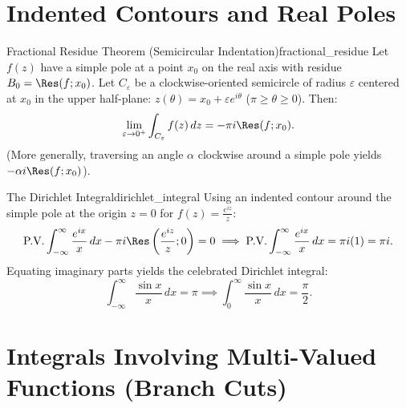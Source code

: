 \section{Indented Contours and Real Poles}

\begin{theorem}{Fractional Residue Theorem (Semicircular Indentation)}{fractional_residue}
Let $f(z)$ have a simple pole at a point $x_0$ on the real axis with residue $B_0 = \Res(f; x_0)$.
Let $C_\varepsilon$ be a clockwise-oriented semicircle of radius $\varepsilon$ centered at $x_0$ in the upper half-plane: $z(\theta) = x_0 + \varepsilon e^{i\theta}$ ($\pi \ge \theta \ge 0$). Then:
\begin{equation}
\lim_{\varepsilon \to 0^+} \int_{C_\varepsilon} f(z)\, dz = -\pi i \Res(f; x_0).
\end{equation}
(More generally, traversing an angle $\alpha$ clockwise around a simple pole yields $-\alpha i \Res(f; x_0)$).
\end{theorem}

\begin{example}{The Dirichlet Integral}{dirichlet_integral}
Using an indented contour around the simple pole at the origin $z = 0$ for $f(z) = \frac{e^{iz}}{z}$:
\begin{equation}
\text{P.V.} \int_{-\infty}^\infty \frac{e^{ix}}{x}\, dx - \pi i \Res\left(\frac{e^{iz}}{z}; 0\right) = 0 \implies \text{P.V.} \int_{-\infty}^\infty \frac{e^{ix}}{x}\, dx = \pi i (1) = \pi i.
\end{equation}
Equating imaginary parts yields the celebrated Dirichlet integral:
\begin{equation}
\int_{-\infty}^\infty \frac{\sin x}{x}\, dx = \pi \implies \int_0^\infty \frac{\sin x}{x}\, dx = \frac{\pi}{2}.
\end{equation}
\end{example}


\section{Integrals Involving Multi-Valued Functions (Branch Cuts)}

